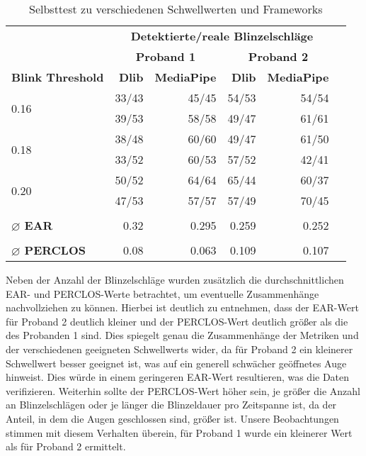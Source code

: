 \begin{table}[!htp]\centering
	\scriptsize
	\begin{tabular}{lrrrrr}%
		&\multicolumn{4}{c}{\textbf{Detektierte/reale Blinzelschläge}} \\\cmidrule{2-5}
		&\multicolumn{2}{c}{\textbf{Proband 1}} &\multicolumn{2}{c}{\textbf{Proband 2}} \\\cmidrule{2-5}
		\textbf{Blink Threshold} &\textbf{Dlib} &\textbf{MediaPipe} &\textbf{Dlib} &\textbf{MediaPipe} \\\midrule
		\multirow{2}{*}{0.16} &33/43 &45/45 &54/53 &54/54 \\
		&39/53 &58/58 &49/47 &61/61 \\
		\multirow{2}{*}{0.18} &38/48 &60/60 &49/47 &61/50 \\
		&33/52 &60/53 &57/52 &42/41 \\
		\multirow{2}{*}{0.20} &50/52 &64/64 &65/44 &60/37 \\
		&47/53 &57/57 &57/49 &70/45 \\
		& & & & \\
		\textbf{$\varnothing$ EAR} &0.32 &0.295 &0.259 &0.252 \\
		& & & & \\
		\textbf{$\varnothing$ PERCLOS} &0.08 &0.063 &0.109 &0.107 \\
	\end{tabular}
	\caption{Selbsttest zu verschiedenen Schwellwerten und Frameworks}\label{table:selbsttest}
\end{table}

Neben der Anzahl der Blinzelschläge wurden zusätzlich die durchschnittlichen EAR- und PERCLOS-Werte betrachtet, um eventuelle Zusammenhänge nachvollziehen zu können. Hierbei ist deutlich zu entnehmen, dass der EAR-Wert für Proband 2 deutlich kleiner und der PERCLOS-Wert deutlich größer als die des Probanden 1 sind. Dies spiegelt genau die Zusammenhänge der Metriken und der verschiedenen geeigneten Schwellwerts wider, da für Proband 2 ein kleinerer Schwellwert besser geeignet ist, was auf ein generell schwächer geöffnetes Auge hinweist. Dies würde in einem geringeren EAR-Wert resultieren, was die Daten verifizieren. Weiterhin sollte der PERCLOS-Wert höher sein, je größer die Anzahl an Blinzelschlägen oder je länger die Blinzeldauer pro Zeitspanne ist, da der Anteil, in dem die Augen geschlossen sind, größer ist. Unsere Beobachtungen stimmen mit diesem Verhalten überein, für Proband 1 wurde ein kleinerer Wert als für Proband 2 ermittelt.

